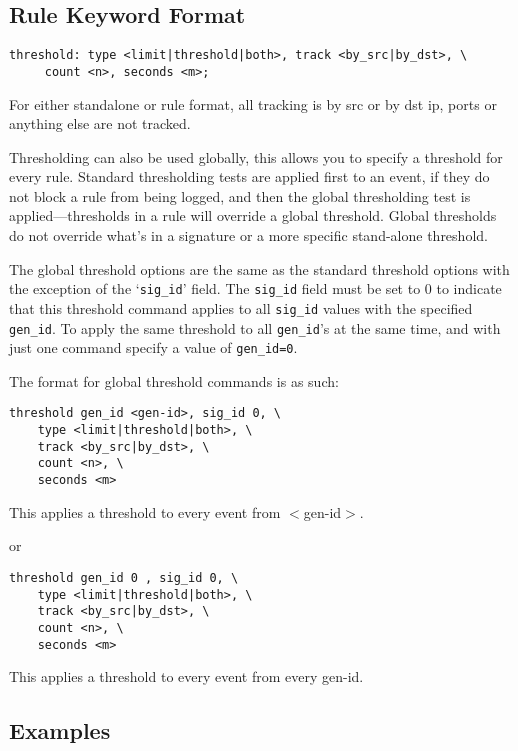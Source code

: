 \documentclass[english]{report}
\begin{document}
\subsection{Rule Keyword Format}
\begin{verbatim}
threshold: type <limit|threshold|both>, track <by_src|by_dst>, \
     count <n>, seconds <m>;
\end{verbatim}

For either standalone or rule format, all tracking is by src or by dst ip,
ports or anything else are not tracked.

Thresholding can also be used globally, this allows you to specify a threshold
for every rule.  Standard thresholding tests are applied first to an event, if
they do not block a rule from being logged, and then the global thresholding
test is applied---thresholds in a rule will override a global threshold. Global 
thresholds do not override what's in a signature or a more specific stand-alone 
threshold.


The global threshold options are the same as the standard threshold options
with the exception of the `\texttt{sig\_id}' field.  The \texttt{sig\_id} field must be set to 0 to
indicate that this threshold command applies to all \texttt{sig\_id} values with the specified
\texttt{gen\_id}. To apply the same threshold to all \texttt{gen\_id}'s at the same time, and with
just one command specify a value of \texttt{gen\_id=0}.

The format for global threshold commands is as such:

\begin{verbatim}
threshold gen_id <gen-id>, sig_id 0, \
    type <limit|threshold|both>, \
    track <by_src|by_dst>, \
    count <n>, \
    seconds <m>  
\end{verbatim}

This applies a threshold to every event from $<$gen-id$>$.

or 

\begin{verbatim}
threshold gen_id 0 , sig_id 0, \
    type <limit|threshold|both>, \
    track <by_src|by_dst>, \
    count <n>, \
    seconds <m>
\end{verbatim}

This applies a threshold to every event from every gen-id. 

\subsection{Examples}
\end{document}
